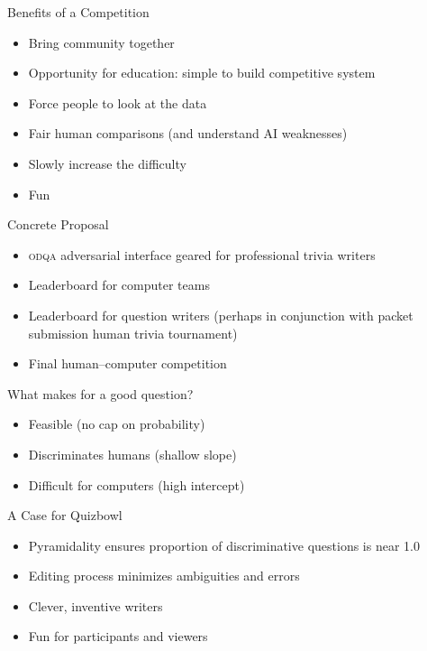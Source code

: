 \documentclass[xcolor=dvipsnames,xcolor=table]{beamer}
\begin{document}
\begin{frame}{Benefits of a Competition}

  \begin{itemize}
  \item Bring community together
  \item Opportunity for education: simple to build competitive system
  \item Force people to look at the data
  \item Fair human comparisons (and understand AI weaknesses)
  \item Slowly increase the difficulty
    \item Fun
  \end{itemize}

\end{frame}

\begin{frame}{Concrete Proposal}

  \begin{itemize}
    \item \textsc{odqa} adversarial interface geared for professional
      trivia writers
    \item Leaderboard for computer teams
    \item Leaderboard for question writers (perhaps in conjunction
      with packet submission human trivia tournament)
    \item Final human--computer competition 
  \end{itemize}

\end{frame}

\begin{frame}{What makes for a good question?}

  \begin{itemize}
  \item Feasible (no cap on probability)
  \item Discriminates humans (shallow slope)
  \item Difficult for computers (high intercept)
  \end{itemize}

\end{frame}


\begin{frame}{A Case for Quizbowl}

  \begin{itemize}
    \item Pyramidality ensures proportion of discriminative questions is near 1.0
    \item Editing process minimizes ambiguities and errors
    \item Clever, inventive writers
    \item Fun for participants and viewers
  \end{itemize}
\end{frame}
\end{document}
